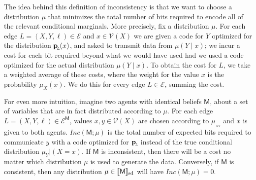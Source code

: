 \documentclass{article}
\DeclarePairedDelimiter{\SD}{\llbracket}{\rrbracket_{\text{sd}}}
\newcommand{\bp}[1][L]{\mat{p}_{\!_{#1}\!}}
\newcommand{\V}{\mathcal V}
\newcommand{\Ed}{\mathcal E}
\newcommand{\sfM}{\mathsf M}
\newcommand\inconsist{\mathit{Inc}}
\numberwithin{equation}{section}
\begin{document}
        The idea behind this definition of inconsistency is that
 	we want to choose a distribution $\mu$ that minimizes the
        total number of bits required to encode all of the relevant
        conditional marginals. 
 	More precisely, fix a distribution $\mu$. For each edge $L = (X, Y,
        \ell) \in \Ed$ and $x \in \V(X)$ we are given a code
        for $Y$ optimized for the distribution $\bp(x)$, and asked to transmit
        data from $\mu(Y\mid x)$; we incur a cost for each bit required beyond what we would have used had we used a code optimized for the actual distribution $\mu(Y\mid x)$. 
       To obtain the cost for $L$, we take a weighted average of these costs, where the weight for the value $x$ is the probability $\mu_X(x)$. We do this for every edge $L \in \Ed$, summing the cost.

	For even more intuition, imagine two agents with identical
        beliefs $\sfM$, about a set of variables that are in fact
        distributed according to $\mu$. For each edge $L = (X,Y, \ell)
        \in \Ed^\sfM$, values $x,y \in \V(X)$ are chosen according to
        $\mu_{_{XY}}$ and $x$ is given to both
        agents. $\inconsist(\sfM;\mu)$ is the total number of expected
        bits required to communicate $y$ with a code optimized for
        $\bp$ instead of the true conditional distribution
        $\mu_Y|(X=x)$. 
	If $\sfM$ is inconsistent, then there will be a cost no matter which distribution $\mu$ is used to generate the data.
	Conversely, if $\sfM$ is consistent, then any distribution $\mu \in \SD{\sfM}$ will have $\inconsist(\sfM; \mu) = 0$. 
	
\end{document}
